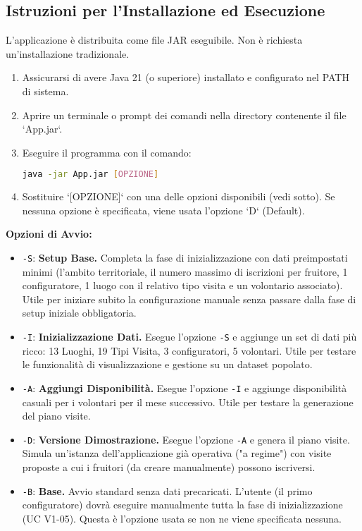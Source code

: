 \documentclass[a4paper,12pt]{article}
\begin{document}
\subsection{Istruzioni per l'Installazione ed Esecuzione}
L'applicazione è distribuita come file JAR eseguibile. Non è richiesta un'installazione tradizionale.
\begin{enumerate}
    \item Assicurarsi di avere Java 21 (o superiore) installato e configurato nel PATH di sistema.
    \item Aprire un terminale o prompt dei comandi nella directory contenente il file `App.jar`.
    \item Eseguire il programma con il comando:
    \begin{lstlisting}[language=bash, numbers=none, frame=single, rulecolor=\color{lightgray}]
java -jar App.jar [OPZIONE]
    \end{lstlisting}
    \item Sostituire `[OPZIONE]` con una delle opzioni disponibili (vedi sotto). Se nessuna opzione è specificata, viene usata l'opzione `D` (Default).
\end{enumerate}

\textbf{Opzioni di Avvio:}
\begin{itemize}
    \item \texttt{-S}: \textbf{Setup Base.} Completa la fase di inizializzazione con dati preimpostati minimi (l'ambito territoriale, il numero massimo di iscrizioni per fruitore, 1 configuratore, 1 luogo con il relativo tipo visita e un volontario associato). Utile per iniziare subito la configurazione manuale senza passare dalla fase di setup iniziale obbligatoria.
    \item \texttt{-I}: \textbf{Inizializzazione Dati.} Esegue l'opzione \texttt{-S} e aggiunge un set di dati più ricco: 13 Luoghi, 19 Tipi Visita, 3 configuratori, 5 volontari. Utile per testare le funzionalità di visualizzazione e gestione su un dataset popolato.
    \item \texttt{-A}: \textbf{Aggiungi Disponibilità.} Esegue l'opzione \texttt{-I} e aggiunge disponibilità casuali per i volontari per il mese successivo. Utile per testare la generazione del piano visite.
    \item \texttt{-D}: \textbf{Versione Dimostrazione.} Esegue l'opzione \texttt{-A} e genera il piano visite. Simula un'istanza dell'applicazione già operativa ("a regime") con visite proposte a cui i fruitori (da creare manualmente) possono iscriversi.
    \item \texttt{-B}: \textbf{Base.} Avvio standard senza dati precaricati. L'utente (il primo configuratore) dovrà eseguire manualmente tutta la fase di inizializzazione (UC V1-05). Questa è l'opzione usata se non ne viene specificata nessuna.
\end{itemize}
\end{document}
